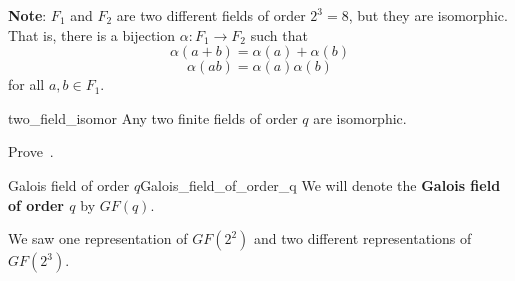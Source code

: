 \textbf{Note}: $ F_1 $ and $ F_2 $ are two different fields of order $ 2^3=8 $,
but they are isomorphic. That is,
there is a bijection $ \alpha : F_1\rightarrow F_2 $ such that
\[ \alpha(a+b)=\alpha(a)+\alpha(b) \]
\[ \alpha(ab)=\alpha(a)\alpha(b) \]
for all $ a,b\in F_1 $.

\begin{Theorem}{}{two_field_isomor}
    Any two finite fields of order $ q $ are isomorphic.
\end{Theorem}

\begin{Exercise}{}{}
    Prove~.
\end{Exercise}

\begin{Definition}{Galois field of order $ q $}{Galois_field_of_order_q}
    We will denote the \textbf{Galois field of order $ q $} by $ GF(q) $.
\end{Definition}

We saw one representation of $ GF(2^2) $
and two different representations of $ GF(2^3) $.
